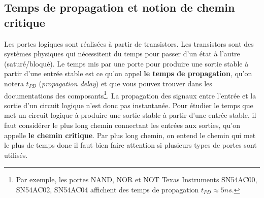 \subsection{Temps de propagation et notion de chemin critique}

Les portes logiques sont réalisées à partir de transistors. Les transistors sont des systèmes physiques qui nécessitent du temps pour passer d'un état à l'autre (saturé/bloqué). Le temps mis par une porte pour produire une sortie stable à partir d'une entrée stable est ce qu'on appel \textbf{le temps de propagation}, qu'on notera $t_{PD}$ (\emph{propagation delay}) et que vous pouvez trouver dans les documentations des composants\footnote{Par exemple, les portes NAND, NOR et NOT Texas Instruments SN54AC00, SN54AC02, SN54AC04 affichent des temps de propagation $t_{PD} \approx 5 ns$.}. La propagation des signaux entre l'entrée et la sortie d'un circuit logique n'est donc pas instantanée. Pour étudier le temps que met un circuit logique à produire une sortie stable à partir d'une entrée stable, il faut considérer le plus long chemin connectant les entrées aux sorties, qu'on appelle \textbf{le chemin critique}. Par plus long chemin, on entend le chemin qui met le plus de temps donc il faut bien faire attention si plusieurs types de portes sont utilisés.


